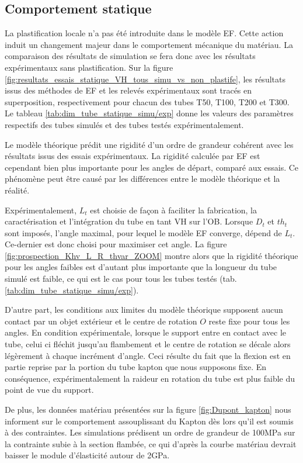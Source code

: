 	\subsection{Comportement statique}
	\label{subsec:5.3.1_Comportement statique}
La plastification locale n'a pas été introduite dans le modèle EF. Cette action induit un changement majeur dans le comportement mécanique du matériau. La comparaison des résultats de simulation se fera donc avec les résultats expérimentaux sans plastification. Sur la figure \ref{fig:resultats_essais_statique_VH_tous_simu_vs_non_plastife}, les résultats issus des méthodes de EF et les relevés expérimentaux sont tracés en superposition, respectivement pour chacun des tubes T50, T100, T200 et T300. Le tableau \ref{tab:dim_tube_statique_simu/exp} donne les valeurs des paramètres respectifs des tubes simulés et des tubes testés expérimentalement.

Le modèle théorique prédit une rigidité d'un ordre de grandeur cohérent avec les résultats issus des essais expérimentaux. La rigidité calculée par EF est cependant bien plus importante pour les angles de départ, comparé aux essais. Ce phénomène peut être causé par les différences entre le modèle théorique et la réalité.

Expérimentalement, $L_t$ est choisie de façon à faciliter la fabrication, la caractérisation et l'intégration du tube en tant VH sur l'OB. Lorsque $D_t$ et $th_t$ sont imposés, l'angle maximal, pour lequel le modèle EF converge, dépend de $L_t$. Ce-dernier est donc choisi pour maximiser cet angle. La figure \ref{fig:prospection_Khv_L_R_thvar_ZOOM} montre alors que la rigidité théorique pour les angles faibles est d'autant plus importante que la longueur du tube simulé est faible, ce qui est le cas pour tous les tubes testés (tab. \ref{tab:dim_tube_statique_simu/exp}).

D'autre part, les conditions aux limites du modèle théorique supposent aucun contact par un objet extérieur et le centre de rotation $O$ reste fixe pour tous les angles. En condition expérimentale, lorsque le support entre en contact avec le tube, celui ci fléchit jusqu'au flambement et le centre de rotation se décale alors légèrement à chaque incrément d'angle. Ceci résulte du fait que la flexion est en partie reprise par la portion du tube kapton que nous supposons fixe. En conséquence,  expérimentalement la raideur en rotation du tube est plus faible du point de vue du support.

De plus, les données matériau présentées sur la figure \ref{fig:Dupont_kapton} nous informent sur le comportement assouplissant du Kapton dès lors qu'il est soumis à des contraintes. Les simulations prédisent un ordre de grandeur de 100MPa sur la contrainte subie à la section flambée, ce qui d'après la courbe matériau devrait baisser le module d'élasticité autour de 2GPa.

